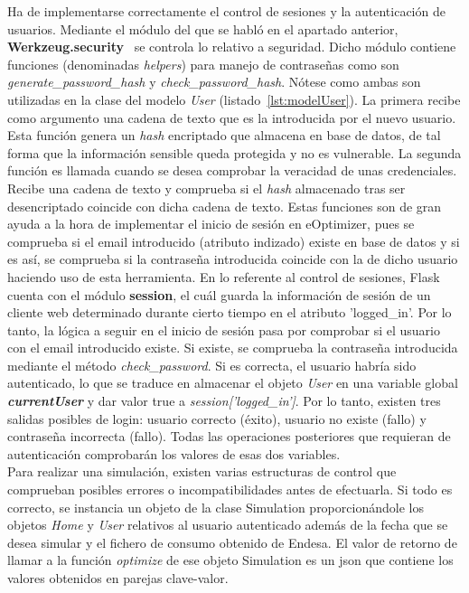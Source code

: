 Ha de implementarse correctamente el control de sesiones y la autenticación de usuarios. Mediante el módulo del que se habló en el apartado anterior, \textbf{Werkzeug.security}~\cite{Werk} se controla lo relativo a seguridad. Dicho módulo contiene funciones (denominadas \textit{helpers}) para manejo de contraseñas como son \textit{generate\_password\_hash} y \textit{check\_password\_hash}. Nótese como ambas son utilizadas en la clase del modelo \textit{User} (listado~\ref{lst:modelUser}). La primera recibe como argumento una cadena de texto que es la introducida por el nuevo usuario. Esta función genera un \textit{hash} encriptado que almacena en base de datos, de tal forma que la información sensible queda protegida y no es vulnerable. La segunda función es llamada cuando se desea comprobar la veracidad de unas credenciales. Recibe una cadena de texto y comprueba si el \textit{hash} almacenado tras ser desencriptado coincide con dicha cadena de texto. Estas funciones son de gran ayuda a la hora de implementar el inicio de sesión en eOptimizer, pues se comprueba si el email introducido (atributo indizado) existe en base de datos y si es así, se comprueba si la contraseña introducida coincide con la de dicho usuario haciendo uso de esta herramienta. En lo referente al control de sesiones, Flask cuenta con el módulo \textbf{session}, el cuál guarda la información de sesión de un cliente web determinado durante cierto tiempo en el atributo 'logged\_in'. Por lo tanto, la lógica a seguir en el inicio de sesión pasa por comprobar si el usuario con el email introducido existe. Si existe, se comprueba la contraseña introducida mediante el método \textit{check\_password}. Si es correcta, el usuario habría sido autenticado, lo que se traduce en almacenar el objeto \textit{User} en una variable global \textbf{\textit{currentUser}} y dar valor true a \textit{session['logged\_in']}. Por lo tanto, existen tres salidas posibles de login: usuario correcto (éxito), usuario no existe (fallo) y contraseña incorrecta (fallo). Todas las operaciones posteriores que requieran de autenticación comprobarán los valores de esas dos variables.\\

Para realizar una simulación, existen varias estructuras de control que comprueban posibles errores o incompatibilidades antes de efectuarla. Si todo es correcto, se instancia un objeto de la clase Simulation proporcionándole los objetos \textit{Home} y \textit{User} relativos al usuario autenticado además de la fecha que se desea simular y el fichero de consumo obtenido de Endesa. El valor de retorno de llamar a la función \textit{optimize} de ese objeto Simulation es un json que contiene los valores obtenidos en parejas clave-valor.\\

